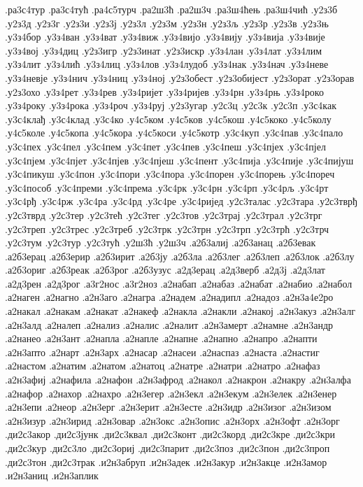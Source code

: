 {.ра3с4тур
.ра3с4тућ
.ра4с5турч
.ра2ш3ћ
.ра2ш3ч
.ра3ш4ћењ
.ра3ш4чић
.у2з3б
.у2з3д
.у2з3г
.у2з3и
.у2з3ј
.у2з3л
.у2з3м
.у2з3н
.у2з3љ
.у2з3р
.у2з3в
.у2з3њ
.у3з4бор
.у3з4ван
.у3з4ват
.у3з4виж
.у3з4вијо
.у3з4вију
.у3з4вија
.у3з4вије
.у3з4вој
.у3з4диц
.у2з3игр
.у2з3инат
.у2з3искр
.у3з4лан
.у3з4лат
.у3з4лим
.у3з4лит
.у3з4лић
.у3з4лиц
.у3з4лов
.у3з4лудоб
.у3з4нак
.у3з4нач
.у3з4неве
.у3з4невје
.у3з4нич
.у3з4ниц
.у3з4ној
.у2з3обест
.у2з3обијест
.у2з3орат
.у2з3орав
.у2з3охо
.у3з4рет
.у3з4рев
.у3з4ријет
.у3з4ријев
.у3з4рн
.у3з4рњ
.у3з4роко
.у3з4року
.у3з4рока
.у3з4роч
.у3з4руј
.у2з3угар
.у2с3ц
.у2с3к
.у2с3п
.у3с4как
.у3с4клађ
.у3с4клад
.у3с4ко
.у4с5ком
.у4с5ков
.у4с5кош
.у4с5коко
.у4с5колу
.у4с5коле
.у4с5копа
.у4с5кора
.у4с5коси
.у4с5котр
.у3с4куп
.у3с4пав
.у3с4пало
.у3с4пех
.у3с4пел
.у3с4пем
.у3с4пет
.у3с4пев
.у3с4пеш
.у3с4пјех
.у3с4пјел
.у3с4пјем
.у3с4пјет
.у3с4пјев
.у3с4пјеш
.у3с4пент
.у3с4пија
.у3с4пије
.у3с4пијуш
.у3с4пикуш
.у3с4пон
.у3с4пори
.у3с4пора
.у3с4порен
.у3с4порењ
.у3с4пореч
.у3с4пособ
.у3с4преми
.у3с4према
.у3с4рк
.у3с4рн
.у3с4рп
.у3с4рљ
.у3с4рт
.у3с4рђ
.у3с4рж
.у3с4ра
.у3с4рд
.у3с4ре
.у3с4ријед
.у2с3талас
.у2с3тара
.у2с3тврђ
.у2с3тврд
.у2с3тер
.у2с3тећ
.у2с3тег
.у2с3тов
.у2с3трај
.у2с3трал
.у2с3трг
.у2с3треп
.у2с3трес
.у2с3треб
.у2с3трк
.у2с3трн
.у2с3трп
.у2с3трћ
.у2с3трч
.у2с3тум
.у2с3тур
.у2с3тућ
.у2ш3ћ
.у2ш3ч
.а2б3алиј
.а2б3анац
.а2б3евак
.а2б3ерац
.а2б3ерир
.а2б3ирит
.а2б3ју
.а2б3ла
.а2б3лег
.а2б3леп
.а2б3лок
.а2б3лу
.а2б3ориг
.а2б3реак
.а2б3рог
.а2б3узус
.а2д3ерац
.а2д3верб
.а2д3ј
.а2д3лат
.а2д3рен
.а2д3рог
.а3г2нос
.а3г2ноз
.а2набап
.а2набаз
.а2набат
.а2набио
.а2набол
.а2наген
.а2нагно
.а2н3аго
.а2награ
.а2надем
.а2надипл
.а2надоз
.а2н3а4е2ро
.а2накал
.а2накам
.а2накат
.а2накеф
.а2накла
.а2накли
.а2накој
.а2н3акуз
.а2н3алг
.а2н3алд
.а2налеп
.а2нализ
.а2налис
.а2налит
.а2н3амерт
.а2намне
.а2н3андр
.а2нанео
.а2н3ант
.а2напла
.а2напле
.а2напне
.а2напно
.а2напро
.а2напти
.а2н3апто
.а2нарт
.а2н3арх
.а2насар
.а2насеи
.а2наспаз
.а2наста
.а2настиг
.а2настом
.а2натим
.а2натом
.а2натоц
.а2натре
.а2натри
.а2натро
.а2нафаз
.а2н3афиј
.а2нафила
.а2нафон
.а2н3афрод
.а2накол
.а2накрон
.а2накру
.а2н3алфа
.а2нафор
.а2нахор
.а2нахро
.а2н3егер
.а2н3екл
.а2н3екум
.а2н3елек
.а2н3енер
.а2н3епи
.а2неор
.а2н3ерг
.а2н3ерит
.а2н3есте
.а2н3идр
.а2н3изог
.а2н3изом
.а2н3изур
.а2н3ирид
.а2н3овар
.а2н3окс
.а2н3опис
.а2н3орх
.а2н3офт
.а2н3орг
.ди2с3акор
.ди2с3јунк
.ди2с3квал
.ди2с3конт
.ди2с3корд
.ди2с3кре
.ди2с3кри
.ди2с3кур
.ди2с3ло
.ди2с3ориј
.ди2с3парит
.ди2с3поз
.ди2с3пон
.ди2с3проп
.ди2с3тон
.ди2с3трак
.и2н3абруп
.и2н3адек
.и2н3акур
.и2н3акце
.и2н3амор
.и2н3аниц
.и2н3аплик
}
